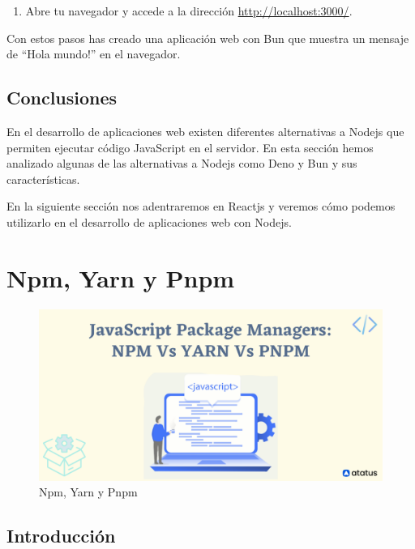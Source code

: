 \documentclass[
  a4paper,
  DIV=11,
  numbers=noendperiod,
  onepage,
  openany]{scrreprt}
\providecommand{\tightlist}{%
  \setlength{\itemsep}{0pt}\setlength{\parskip}{0pt}}\usepackage{longtable,booktabs,array}
\begin{document}
\begin{enumerate}
\def\labelenumi{\arabic{enumi}.}
\setcounter{enumi}{2}
\tightlist
\item
  Abre tu navegador y accede a la dirección
  \url{http://localhost:3000/}.
\end{enumerate}

Con estos pasos has creado una aplicación web con Bun que muestra un
mensaje de ``Hola mundo!'' en el navegador.

\section{Conclusiones}\label{conclusiones-3}

En el desarrollo de aplicaciones web existen diferentes alternativas a
Nodejs que permiten ejecutar código JavaScript en el servidor. En esta
sección hemos analizado algunas de las alternativas a Nodejs como Deno y
Bun y sus características.

En la siguiente sección nos adentraremos en Reactjs y veremos cómo
podemos utilizarlo en el desarrollo de aplicaciones web con Nodejs.

\chapter{Npm, Yarn y Pnpm}\label{npm-yarn-y-pnpm}

\begin{figure}[H]

{\centering \includegraphics{images/npm-vs-yarn-vs-pnpm-1.png}

}

\caption{Npm, Yarn y Pnpm}

\end{figure}%

\section{Introducción}\label{introducciuxf3n-2}
\end{document}
